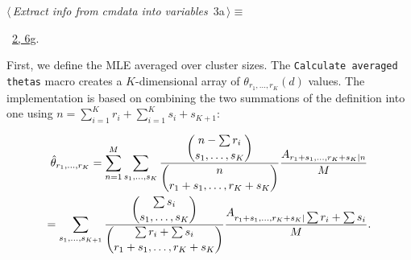 \documentclass[reqno]{amsart}
\renewcommand{\NWtarget}[2]{\hypertarget{#1}{#2}}
\renewcommand{\NWlink}[2]{\hyperlink{#1}{#2}}
\providecommand{\tsum}{\textstyle\sum}
\newcommand{\thetar}[1]{\theta_{r_1,\ldots,r_{#1}}}
\newcommand{\hthetar}[1]{\hat{\theta}_{r_1,\ldots,r_{#1}}}
\begin{document}
\begin{flushleft} \small
\begin{minipage}{\linewidth}\label{scrap3}\raggedright\small
\NWtarget{nuweb3a}{} $\langle\,${\itshape Extract info from cmdata into variables}\nobreak\ {\footnotesize {3a}}$\,\rangle\equiv$
\vspace{-1ex}
\vspace{-1.5ex}
\footnotesize
\begin{list}{}{\setlength{\itemsep}{-\parsep}\setlength{\itemindent}{-\leftmargin}}
\item \NWtxtMacroRefIn\ \NWlink{nuweb2}{2}\NWlink{nuweb6g}{, 6g}.

\item{}
\end{list}
\end{minipage}\vspace{4ex}
\end{flushleft}
First, we define the MLE averaged over cluster sizes. The \texttt{Calculate averaged thetas} macro
creates a $K$-dimensional array of $\thetar{K}(d)$ values.  
The implementation is based on combining the two summations
of the definition into one using $n=\sum_{i=1}^K r_i + \sum_{i=1}^K s_i + s_{K+1}$:

\begin{multline} 
\hthetar{K}=\sum_{n=1}^M\sum_{s_1,\ldots,s_{K}}\frac{\dbinom{n-\tsum{r_i}}{s_1,\ldots,s_{K}}}%
  {\dbinom{n}{r_1+s_1,\ldots,r_K+s_{K}}}\frac{A_{r_1+s_1,\ldots,r_K+s_K|n}}{M} \\
  = \sum_{s_1,\ldots,s_{K+1}}\frac{\dbinom{\tsum{s_i}}{s_1,\ldots,s_{K}}}%
  {\dbinom{\tsum r_i + \tsum{s_i}}{r_1+s_1,\ldots,r_K+s_{K}}}\frac{A_{r_1+s_1,\ldots,r_K+s_K|\tsum r_i + \tsum{s_i}}}{M}.
\end{multline}%
\end{document}
